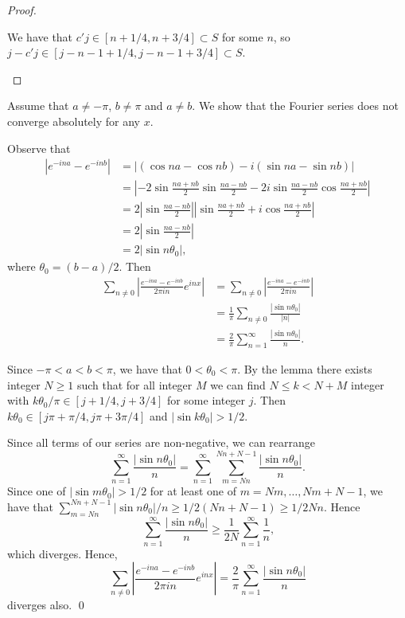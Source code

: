 \documentclass[oneside]{article}
\newcommand\abs[1]{\left|#1\right|}
\begin{document}
\begin{enumerate}[label=(\alph*)]
\begin{proof}
\begin{itemize}[leftmargin=45pt]
        We have that $c'j \in [n + 1/4, n + 3/4] \subset S$ for some $n$, so
        $j-c'j \in [j-n - 1 + 1/4, j-n-1 + 3/4] \subset S$.
      \end{itemize}
    \end{proof}

    Assume that $a\neq-\pi$, $b\neq\pi$ and $a \neq b$. We show that the
    Fourier series does not converge absolutely for any $x$.

    Observe that\begin{align*}
      \abs{e^{-ina}-e^{-inb}}
      &= \abs{(\cos na -\cos nb) - i(\sin na - \sin nb)} \\
      &= \abs{-2\sin\frac{na+nb}2\sin\frac{na-nb}2
      - 2i\sin\frac{na-nb}2\cos\frac{na+nb}2} \\
      &= 2 \abs{\sin\frac{na-nb}2}
      \abs{\sin\frac{na+nb}2 + i\cos\frac{na+nb}2} \\
      &= 2 \abs{\sin\frac{na-nb}2}\\
      &= 2 \abs{\sin n\theta_0} \text{,}
    \end{align*} where $\theta_0 = (b-a)/2$. Then\begin{align*}
      \sum_{n\neq0}\abs{\frac{e^{-ina}-e^{-inb}}{2\pi in}e^{inx}}
      &= \sum_{n\neq0}\abs{\frac{e^{-ina}-e^{-inb}}{2\pi in}} \\
      &= \frac{1}{\pi}\sum_{n\neq0}\frac{\abs{\sin n\theta_0}}{\abs{n}} \\
      &= \frac{2}{\pi}\sum_{n=1}^\infty\frac{\abs{\sin n\theta_0}}{n}
      \text{.}
    \end{align*}

    Since $-\pi < a < b < \pi$, we have that $0 < \theta_0 < \pi$. By the lemma
    there exists integer $N \geq 1$ such that for all integer $M$ we can find
    $N \leq k < N+M$ integer with $k\theta_0/\pi \in [j + 1/4, j + 3/4]$ for
    some integer $j$. Then $k\theta_0 \in [j\pi + \pi/4, j\pi + 3\pi/4]$ and
    $\abs{\sin k \theta_0} > 1/2$.

    Since all terms of our series are non-negative, we can rearrange
    \[
      \sum_{n=1}^\infty\frac{\abs{\sin n\theta_0}}{n}
      = \sum_{n=1}^\infty \sum_{m=Nn}^{Nn+N-1}
      \frac{\abs{\sin n\theta_0}}{n}
      \text{.}
    \] Since one of $\abs{\sin m \theta_0} > 1/2$ for at least one of
    $m = Nm, \dots, Nm+N-1$, we have that
    $\sum_{m=Nn}^{Nn+N-1} \abs{\sin n\theta_0}/n \geq 1/2(Nn + N -1) \geq 1/2Nn$.
    Hence \[
      \sum_{n=1}^\infty\frac{\abs{\sin n\theta_0}}{n} \geq
      \frac{1}{2N}\sum_{n=1}^\infty \frac{1}{n} \text{,}
    \] which diverges. Hence,\[
      \sum_{n\neq0}\abs{\frac{e^{-ina}-e^{-inb}}{2\pi in}e^{inx}}
      = \frac{2}{\pi}\sum_{n=1}^\infty\frac{\abs{\sin n\theta_0}}{n}
    \] diverges also. \qed


\end{enumerate}
\end{document}
